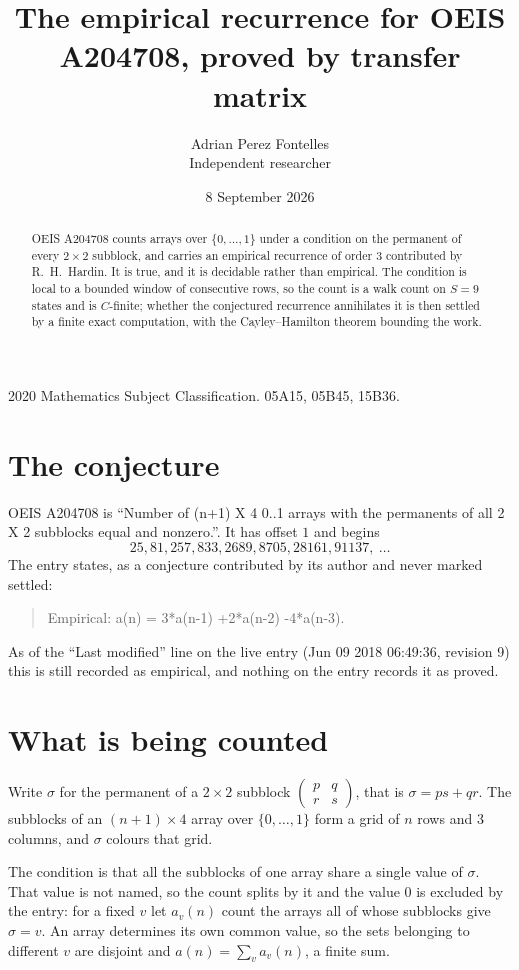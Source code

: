 \documentclass[11pt,a4paper]{article}
\title{The empirical recurrence for OEIS A204708, proved by transfer matrix}
\author{Adrian Perez Fontelles\\ \small Independent researcher}
\date{8 September 2026}
\theoremstyle{plain}
\theoremstyle{definition}
\begin{document}
\maketitle

\begin{abstract}
OEIS A204708 counts arrays over $\{0,\dots,1\}$ under a condition on the permanent of every
$2\times2$ subblock, and carries an empirical recurrence of order $3$ contributed by
R.~H.~Hardin. It is true, and it is decidable rather than empirical. The condition is local to
a bounded window of consecutive rows, so the count is a walk count on $S=9$ states and is
$C$-finite; whether the conjectured recurrence annihilates it is then settled by a finite exact
computation, with the Cayley--Hamilton theorem bounding the work.
\end{abstract}

\noindent\small 2020 Mathematics Subject Classification. 05A15, 05B45, 15B36.\normalsize

\section{The conjecture}

OEIS A204708 is ``Number of (n+1) X 4 0..1 arrays with the permanents of all 2 X 2 subblocks equal and nonzero.''. It has offset $1$ and begins
\[
25, 81, 257, 833, 2689, 8705, 28161, 91137,\ \dots
\]
The entry states, as a conjecture contributed by its author and never marked settled:
\begin{quote}
Empirical: a(n) = 3*a(n-1) +2*a(n-2) -4*a(n-3).
\end{quote}
As of the ``Last modified'' line on the live entry (Jun 09 2018 06:49:36, revision 9) this is still
recorded as empirical, and nothing on the entry records it as proved.

\section{What is being counted}

Write $\sigma$ for the permanent of a $2\times2$ subblock
$\begin{pmatrix}p&q\\r&s\end{pmatrix}$, that is $\sigma=ps+qr$. The subblocks of an
$(n+1)\times4$ array over $\{0,\dots,1\}$ form a grid of $n$ rows and $3$
columns, and $\sigma$ colours that grid.

The condition is that all the subblocks of one array share a single value of $\sigma$. That
value is not named, so the count splits by it and the value $0$ is excluded by the entry: for a fixed $v$ let $a_v(n)$ count the
arrays all of whose subblocks give $\sigma=v$. An array determines its own common value, so
the sets belonging to different $v$ are disjoint and $a(n)=\sum_v a_v(n)$, a finite sum.
\end{document}

